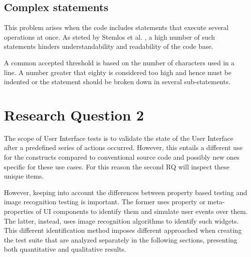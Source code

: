 \subsection{Complex statements}
This problem arises when the code includes statements that execute several operations at once. As steted by Stemlos et al. \cite{metrics_source_code}, a high number of such statements hinders understandability and readability of the code base.

A common accepted threshold is based on the number of characters used in a line. A number greater that eighty is considered too high and hence must be indented or the statement should be broken down in several sub-statements.



\section{Research Question 2}

The scope of User Interface tests is to validate the state of the User Interface after a predefined series of actions occurred. However, this entails a different use for the constructs compared to conventional source code and possibly new ones specific for these use cases. For this reason the second RQ will inspect these unique items.

However, keeping into account the differences between property based testing and image recognition testing is important. The former uses property or meta-properties of UI components to identify them and simulate user events over them. The latter, instead, uses image recognition algorithms to identify such widgets. This different identification method imposes different approached when creating the test suite that are analyzed separately in the following sections, presenting both quantitative and qualitative results.


